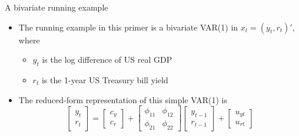 \documentclass[10pt,handout]{beamer}
\begin{document}
\begin{frame}
{A bivariate running example}
\begin{itemize}
\item The running example in this primer is a bivariate VAR(1) in $x_t=(y_t,r_t)'$, where \smallskip
\begin{itemize}
\item $y_t$ is the log difference of US real GDP \smallskip
\item $r_t$ is the 1-year US Treasury bill yield \medskip
\end{itemize}
\end{itemize}\pause
\begin{center}
\smallskip\pause
\end{center}
\begin{itemize}
\item The reduced-form representation of this simple VAR(1) is\smallskip
\begin{equation*}
\begin{bmatrix} y_t \\ r_t \end{bmatrix}
= \begin{bmatrix} c_y \\ c_r \end{bmatrix}
+ \begin{bmatrix} \phi_{11} & \phi_{12} \\ \phi_{21} & \phi_{22} \end{bmatrix}
\begin{bmatrix} y_{t-1} \\ r_{t-1} \end{bmatrix}
+ \begin{bmatrix} u_{yt} \\ u_{rt} \end{bmatrix}
\end{equation*}
\end{itemize}
\end{frame}
\shownotesblock{}
\end{document}
